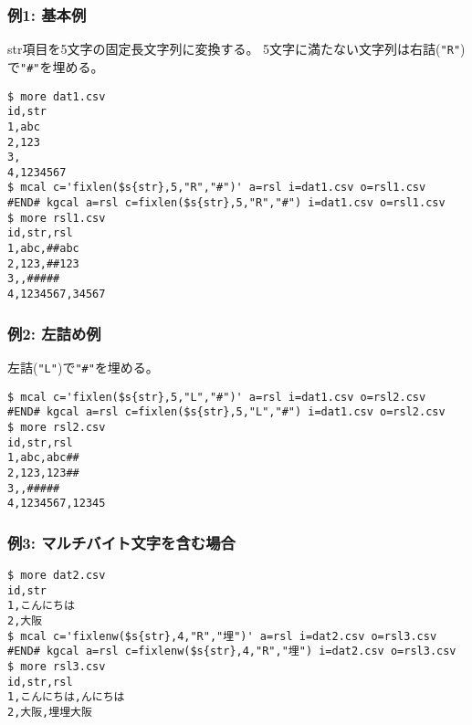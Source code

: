 \subsubsection*{例1: 基本例}

str項目を5文字の固定長文字列に変換する。
5文字に満たない文字列は右詰(\verb|"R"|)で\verb|"#"|を埋める。


\begin{Verbatim}[baselinestretch=0.7,frame=single]
$ more dat1.csv
id,str
1,abc
2,123
3,
4,1234567
$ mcal c='fixlen($s{str},5,"R","#")' a=rsl i=dat1.csv o=rsl1.csv
#END# kgcal a=rsl c=fixlen($s{str},5,"R","#") i=dat1.csv o=rsl1.csv
$ more rsl1.csv
id,str,rsl
1,abc,##abc
2,123,##123
3,,#####
4,1234567,34567
\end{Verbatim}
\subsubsection*{例2: 左詰め例}

左詰(\verb|"L"|)で\verb|"#"|を埋める。


\begin{Verbatim}[baselinestretch=0.7,frame=single]
$ mcal c='fixlen($s{str},5,"L","#")' a=rsl i=dat1.csv o=rsl2.csv
#END# kgcal a=rsl c=fixlen($s{str},5,"L","#") i=dat1.csv o=rsl2.csv
$ more rsl2.csv
id,str,rsl
1,abc,abc##
2,123,123##
3,,#####
4,1234567,12345
\end{Verbatim}
\subsubsection*{例3: マルチバイト文字を含む場合}



\begin{Verbatim}[baselinestretch=0.7,frame=single]
$ more dat2.csv
id,str
1,こんにちは
2,大阪
$ mcal c='fixlenw($s{str},4,"R","埋")' a=rsl i=dat2.csv o=rsl3.csv
#END# kgcal a=rsl c=fixlenw($s{str},4,"R","埋") i=dat2.csv o=rsl3.csv
$ more rsl3.csv
id,str,rsl
1,こんにちは,んにちは
2,大阪,埋埋大阪
\end{Verbatim}
